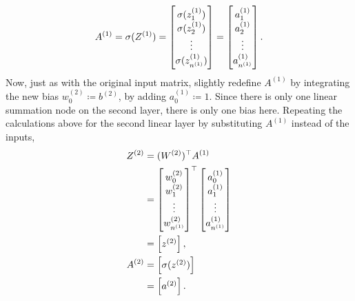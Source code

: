 \begin{align*}
    A^{(1)}
        = \sigma(Z^{(1)})
        =
        \arraycolsep=2pt\def\arraystretch{1.1}
        \begin{bmatrix}
            \sigma(z^{(1)}_1) \\ \sigma(z^{(1)}_2) \\ \vdots \\ \sigma(z^{(1)}_{n^{(1)}})
        \end{bmatrix}
        =
        \arraycolsep=2pt\def\arraystretch{1.1}
        \begin{bmatrix}
            a^{(1)}_1 \\ a^{(1)}_2 \\ \vdots \\ a^{(1)}_{n^{(1)}}
        \end{bmatrix}.
\end{align*}
Now, just as with the original input matrix, slightly redefine $A^{(1)}$ by integrating the new bias $w^{(2)}_{0}\coloneqq b^{(2)}$, by adding $a^{(1)}_0\coloneqq 1$. Since there is only one linear summation node on the second layer, there is only one bias here. 
Repeating the calculations above for the second linear layer by substituting $A^{(1)}$ instead of the inputs,
\begin{align*}
    Z^{(2)}   &= (W^{(2)})^\top A^{(1)} \\
        &=
        \arraycolsep=2pt\def\arraystretch{1.1}
        \begin{bmatrix}
            w^{(2)}_0 \\ w^{(2)}_1 \\ \vdots \\ w^{(2)}_{n^{(1)}}
        \end{bmatrix}^\top
        \arraycolsep=2pt\def\arraystretch{1.1}
        \begin{bmatrix}
            a^{(1)}_0 \\ a^{(1)}_1 \\ \vdots \\ a^{(1)}_{n^{(1)}}
        \end{bmatrix}\\
        &=\begin{bmatrix}
            z^{(2)}
        \end{bmatrix}, \\
         A^{(2)}  &= \begin{bmatrix} \sigma(z^{(2)})\end{bmatrix}\\
           &= \begin{bmatrix} a^{(2)}\end{bmatrix}.
\end{align*}
